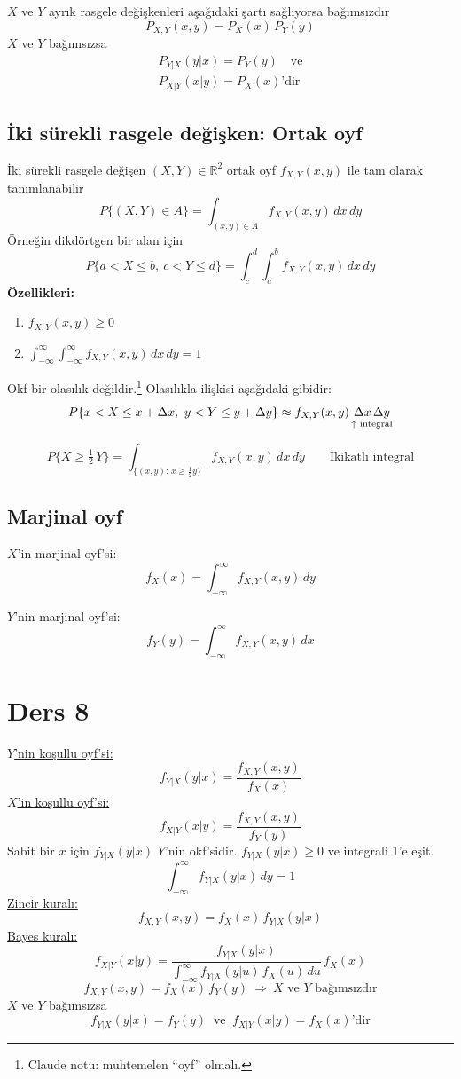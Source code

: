 \documentclass[11pt,a4paper]{article}
\begin{document}
$X$ ve $Y$ ayrık rasgele değişkenleri aşağıdaki şartı sağlıyorsa bağımsızdır
\[ P_{X,Y}(x,y)=P_X(x)\,P_Y(y) \]
$X$ ve $Y$ bağımsızsa
\begin{gather*}
  P_{Y|X}(y|x)=P_Y(y) \quad\text{ve}\\
  P_{X|Y}(x|y)=P_X(x)\text{'dir}
\end{gather*}

\subsection{İki sürekli rasgele değişken: Ortak oyf}
İki sürekli rasgele değişen $(X,Y)\in\mathbb{R}^2$ ortak oyf $f_{X,Y}(x,y)$ ile tam olarak tanımlanabilir
\[ P\{(X,Y)\in A\}=\int_{(x,y)\in A}f_{X,Y}(x,y)\,dx\,dy \]
Örneğin dikdörtgen bir alan için
\[ P\{a<X\le b,\ c<Y\le d\}=\int_{c}^{d}\int_{a}^{b}f_{X,Y}(x,y)\,dx\,dy \]
\textbf{Özellikleri:}
\begin{enumerate}[nosep]
  \item $f_{X,Y}(x,y)\geq 0$
  \item $\displaystyle\int_{-\infty}^{\infty}\int_{-\infty}^{\infty}f_{X,Y}(x,y)\,dx\,dy=1$
\end{enumerate}
\vurgu[pembe]{$\star$} Okf bir olasılık değildir.\footnote{Claude notu: muhtemelen ``oyf'' olmalı.} Olasılıkla ilişkisi aşağıdaki gibidir:
\[ P\{x<X\le x+\Delta x,\ y<Y\le y+\Delta y\}\approx f_{X,Y}(x,y)\,\underset{\text{\scriptsize $\uparrow$ integral}}{\Delta x\,\Delta y} \]
\begin{ornek}
  \[ P\Big\{X\ge \tfrac{1}{2}\,Y\Big\}=\int_{\{(x,y):\,x\ge\frac{1}{2}y\}}f_{X,Y}(x,y)\,dx\,dy \qquad \text{İkikatlı integral} \]
\end{ornek}

\subsection{Marjinal oyf}
\noindent
\begin{minipage}[t]{0.48\linewidth}
$X$'in marjinal oyf'si:
\[ f_X(x)=\int_{-\infty}^{\infty}f_{X,Y}(x,y)\,dy \]
\end{minipage}\hfill
\begin{minipage}[t]{0.48\linewidth}
$Y$'nin marjinal oyf'si:
\[ f_Y(y)=\int_{-\infty}^{\infty}f_{X,Y}(x,y)\,dx \]
\end{minipage}

\section{Ders 8}
\underline{$Y$'nin koşullu oyf'si:}
\[ f_{Y|X}(y|x)=\frac{f_{X,Y}(x,y)}{f_X(x)} \]
\underline{$X$'in koşullu oyf'si:}
\[ f_{X|Y}(x|y)=\frac{f_{X,Y}(x,y)}{f_Y(y)} \]
Sabit bir $x$ için $f_{Y|X}(y|x)$ $Y$'nin okf'sidir. $f_{Y|X}(y|x)\geq 0$ ve integrali 1'e eşit.
\[ \int_{-\infty}^{\infty}f_{Y|X}(y|x)\,dy=1 \]
\underline{Zincir kuralı:}
\[ f_{X,Y}(x,y)=f_X(x)\,f_{Y|X}(y|x) \]
\underline{Bayes kuralı:}
\[ f_{X|Y}(x|y)=\frac{f_{Y|X}(y|x)}{\int_{-\infty}^{\infty}f_{Y|X}(y|u)\,f_X(u)\,du}\,f_X(x) \]
\[ f_{X,Y}(x,y)=f_X(x)\,f_Y(y)\ \Rightarrow\ X\text{ ve }Y\text{ bağımsızdır} \]
$X$ ve $Y$ bağımsızsa
\[ f_{Y|X}(y|x)=f_Y(y)\ \text{ ve }\ f_{X|Y}(x|y)=f_X(x)\text{'dir} \]
\end{document}
